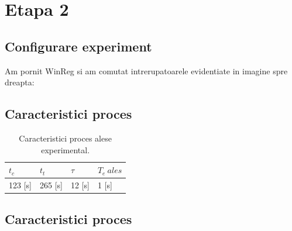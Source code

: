 \documentclass[12pt,english]{article}
\begin{document}
\section {Etapa 2}

\subsection {Configurare experiment}

Am pornit WinReg si am comutat intrerupatoarele evidentiate in imagine spre dreapta:

\begin{figure}[H]
  \centering
\end{figure}

\subsection {Caracteristici proces}
\begin{table}[H]
  \centering
  \begin{tabular}{|l|l|l|l|}
    \hline
    $t_c$ & $t_t$ & $\tau$ & $T_e\ ales$ \\
    \hline
    123 [s] & 265 [s] & 12 [s] & 1 [s] \\
    \hline
  \end{tabular}
  \caption{Caracteristici proces alese experimental.}
\end{table}

\subsection {Caracteristici proces }
\end{document}
